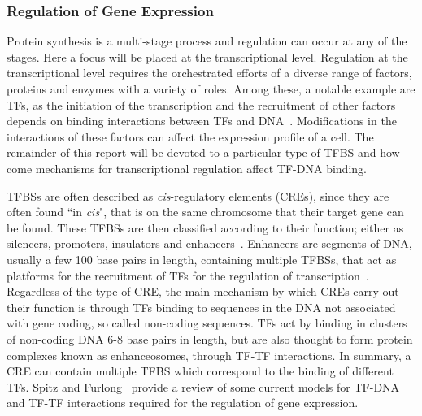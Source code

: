         
        \subsubsection{Regulation of Gene Expression}
        
        Protein synthesis is a multi-stage process and regulation can occur at any of the stages. Here a focus will be placed at the transcriptional level.
        Regulation at the transcriptional level requires the orchestrated efforts of a diverse range of factors, proteins and enzymes with a variety of roles. Among these, a notable example are TFs, as the initiation of the transcription and the recruitment of other factors depends on binding interactions between TFs and DNA~\cite{lemon2000orchestrated}. Modifications in the interactions of these factors can affect the expression profile of a cell. The remainder of this report will be devoted to a particular type of TFBS and how come mechanisms for transcriptional regulation affect TF-DNA binding. 
        
        
        TFBSs are often described as \emph{cis}-regulatory elements (CREs), since they are often found ``in \emph{cis}", that is on the same chromosome that their target gene can be found. These TFBSs are then classified according to their function; either as silencers, promoters, insulators and enhancers~\cite{gaszner2006insulators, gross1988nuclease, li1999locus}. Enhancers are segments of DNA, usually a few 100 base pairs in length,  containing multiple TFBSs, that act as platforms for the recruitment of TFs for the regulation of transcription~\cite{spitz2012transcription}. 
        Regardless of the type of CRE, the main mechanism by which CREs carry out their function is through TFs binding to sequences in the DNA not associated with gene coding, so called non-coding sequences. 
        TFs act by binding in clusters of non-coding DNA 6-8 base pairs in length, but are also thought to form protein complexes known as enhanceosomes, through TF-TF interactions. In summary, a CRE can contain multiple TFBS which correspond to the binding of different TFs. Spitz and Furlong~\cite{spitz2012transcription} provide a review of some current models for TF-DNA and TF-TF interactions required for the regulation of gene expression.
        
